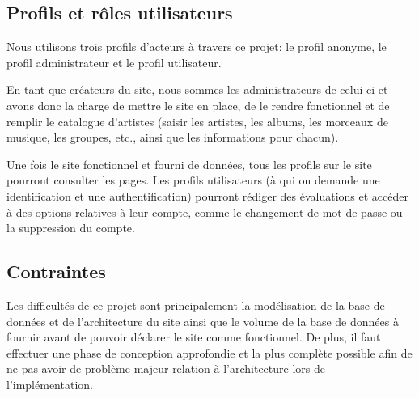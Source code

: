     \subsection{Profils et rôles utilisateurs}

        \begin{paragraphe}
            Nous utilisons trois profils d’acteurs à travers ce projet: le profil
            anonyme, le profil administrateur et le profil utilisateur.
        \end{paragraphe}

        \begin{paragraphe}
            En tant que créateurs du site, nous sommes les administrateurs de celui-ci
            et avons donc la charge de mettre le site en place, de le rendre
            fonctionnel et de remplir le catalogue d'artistes (saisir les artistes, les
            albums, les morceaux de musique, les groupes, etc., ainsi que les informations pour chacun).
        \end{paragraphe}

        \begin{paragraphe}
            Une fois le site fonctionnel et fourni de données, tous les profils sur le site pourront
            consulter les pages.
            Les profils utilisateurs (à qui on demande une identification et une authentification) 
            pourront rédiger des évaluations et accéder à des options relatives à leur compte, comme le changement de mot
            de passe ou la suppression du compte.
        \end{paragraphe}

    \subsection{Contraintes}

        \begin{paragraphe}
            Les difficultés de ce projet sont principalement la modélisation de la base de données et de l'architecture du site
             ainsi que le volume de la base de données à fournir avant de pouvoir déclarer le site comme
            fonctionnel. De plus, il faut effectuer une phase de conception approfondie et la 
            plus complète possible afin de ne pas avoir de problème majeur relation à l'architecture lors de l'implémentation.
        \end{paragraphe}
        
\newpage

